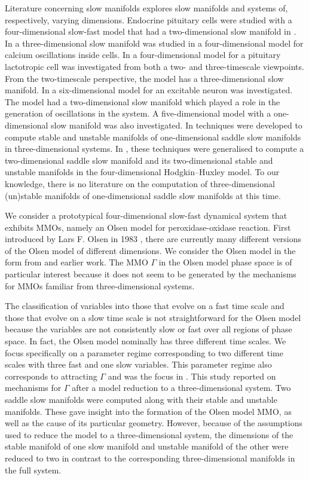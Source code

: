 \documentclass{ws-ijbc}
\begin{document}
Literature concerning slow manifolds explores slow manifolds and systems of, respectively, varying dimensions. Endocrine pituitary cells were studied with a four-dimensional slow-fast model that had a two-dimensional slow manifold in \cite{Vo_paper2}.  In \cite{Emily_Harvey_paper} a three-dimensional slow manifold was studied in a four-dimensional model for calcium oscillations inside cells. In \cite{Vo_paper} a four-dimensional model for a pituitary lactotropic cell was investigated from both a two- and three-timescale viewpoints.  From the two-timescale perspective, the model has a three-dimensional slow manifold.  In \cite{Martin_neuron_paper} a six-dimensional model for an excitable neuron was investigated.  The model had a two-dimensional slow manifold which played a role in the generation of oscillations in the system.  A five-dimensional model with a one-dimensional slow manifold was also investigated.  In \cite{Saeed_Paper} techniques were developed to compute stable and unstable manifolds of one-dimensional saddle slow manifolds in three-dimensional systems. In \cite{Cris_paper}, these techniques were generalised to compute a two-dimensional saddle slow manifold and its two-dimensional stable and unstable manifolds in the four-dimensional Hodgkin--Huxley model.  To our knowledge, there is no literature on the computation of three-dimensional (un)stable manifolds of one-dimensional saddle slow manifolds at this time.

We consider a prototypical four-dimensional slow-fast dynamical system that exhibits MMOs, namely an Olsen model for peroxidase-oxidase reaction.  First introduced by Lars F. Olsen in 1983  \cite{Olsen}, there are currently many different versions of the Olsen model of different dimensions.  We consider the Olsen model in the form from \cite{Rescaling} and earlier work.  The MMO $\Gamma$ in the Olsen model phase space is of particular interest because it does not seem to be generated by the mechanisms for MMOs familiar from three-dimensional systems.

The classification of variables into those that evolve on a fast time scale and those that evolve on a slow time scale is not straightforward for the Olsen model because the variables are not consistently slow or fast over all regions of phase space.  In fact, the Olsen model nominally has three different time scales.  We focus specifically on a parameter regime corresponding to two different time scales with three fast and one slow variables.  This parameter regime also corresponds to attracting $\Gamma$ and was the focus in \cite{QSSA}.  This study reported on mechanisms for $\Gamma$ after a model reduction to a three-dimensional system.  Two saddle slow manifolds were computed along with their stable and unstable manifolds.  These gave insight into the formation of the Olsen model MMO, as well as the cause of its particular geometry.  However, because of the assumptions used to reduce the model to a three-dimensional system, the dimensions of the stable manifold of one slow manifold and unstable manifold of the other were reduced to two in contrast to the corresponding three-dimensional manifolds in the full system.  
\end{document}
